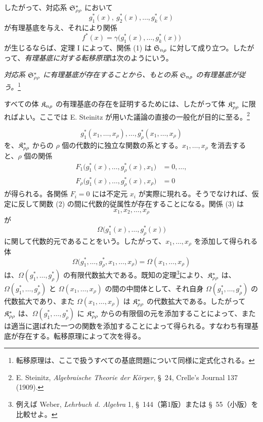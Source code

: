 \documentclass[11pt]{article}
\begin{document}
したがって、対応系 $\mathfrak{S}^*_{\rho\rho}$ において
\[
  g_1^*(x),\ g_2^*(x),\ldots,g_k^*(x)
\]
が有理基底を与え、それにより関係
\[
  f^*(x)=\gamma\bigl(g_1^*(x),\ldots,g_k^*(x)\bigr)
\]
が生じるならば、定理 I によって、関係 (1) は $\mathfrak{S}_{n\rho}$ に対して成り立つ。したがって、\emph{有理基底に対する転移原理}は次のようにいう。

\emph{対応系 $\mathfrak{S}^*_{\rho\rho}$ に有理基底が存在することから、もとの系 $\mathfrak{S}_{n\rho}$ の有理基底が従う。}\footnote{転移原理は、ここで扱うすべての基底問題について同様に定式化される。}

すべての体 $\mathfrak{K}_{n\rho}$ の有理基底の存在を証明するためには、したがって体 $\mathfrak{K}^*_{\rho\rho}$ に限ればよい。ここでは E. Steinitz が用いた議論の直接の一般化が目的に至る。\footnote{E. Steinitz, \emph{Algebraische Theorie der Körper}, \S\ 24, Crelle's Journal 137 (1909).}

\begin{equation}
  g_1^*(x_1,\ldots,x_\rho),\ldots,
  g_\rho^*(x_1,\ldots,x_\rho)
\tag{2}
\end{equation}
を、$\mathfrak{K}^*_{\rho\rho}$ からの $\rho$ 個の代数的に独立な関数の系とする。$x_1,\ldots,x_\rho$ を消去すると、$\rho$ 個の関係
\begin{equation}
\begin{aligned}
  F_1\bigl(g_1^*(x),\ldots,g_\rho^*(x),x_1\bigr)&=0,\ldots,\\
  F_\rho\bigl(g_1^*(x),\ldots,g_\rho^*(x),x_\rho\bigr)&=0
\end{aligned}
\tag{3}
\end{equation}
が得られる。各関係 $F_i=0$ には不定元 $x_i$ が実際に現れる。そうでなければ、仮定に反して関数 (2) の間に代数的従属性が存在することになる。関係 (3) は
\[
  x_1,x_2,\ldots,x_\rho
\]
が
\[
  \Omega\bigl(g_1^*(x),\ldots,g_\rho^*(x)\bigr)
\]
に関して代数的元であることをいう。したがって、$x_1,\ldots,x_\rho$ を添加して得られる体
\[
  \Omega\bigl(g_1^*,\ldots,g_\rho^*,x_1,
  \ldots,x_\rho\bigr)=\Omega(x_1,
  \ldots,x_\rho)
\]
は、$\Omega(g_1^*,\ldots,g_\rho^*)$ の有限代数拡大である。既知の定理\footnote{例えば Weber, \emph{Lehrbuch d. Algebra} 1, \S\ 144（第1版）または \S\ 55（小版）を比較せよ。}により、$\mathfrak{K}^*_{\rho\rho}$ は、$\Omega(g_1^*,\ldots,g_\rho^*)$ と $\Omega(x_1,\ldots,x_\rho)$ の間の中間体として、それ自身 $\Omega(g_1^*,\ldots,g_\rho^*)$ の代数拡大であり、また $\Omega(x_1,\ldots,x_\rho)$ は $\mathfrak{K}^*_{\rho\rho}$ の代数拡大である。したがって $\mathfrak{K}^*_{\rho\rho}$ は、$\Omega(g_1^*,\ldots,g_\rho^*)$ に $\mathfrak{K}^*_{\rho\rho}$ からの有限個の元を添加することによって、または適当に選ばれた一つの関数を添加することによって得られる。すなわち有理基底が存在する。転移原理によって次を得る。
\end{document}
